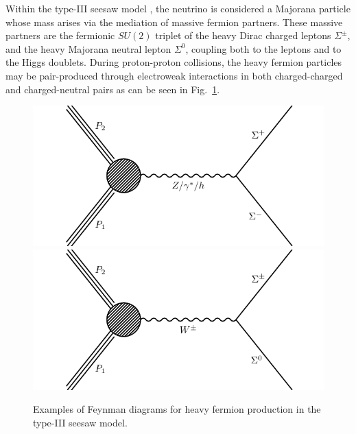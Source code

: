 
Within the type-III seesaw model \cite{SeesawIII:a}, the neutrino is considered a Majorana particle whose mass arises via the mediation of massive fermion partners. These massive partners are the fermionic $SU(2)$ triplet of the heavy Dirac charged leptons $\Sigma^\pm$, and the heavy Majorana neutral lepton $\Sigma^0$, coupling both to the leptons and to the Higgs doublets. During proton-proton collisions, the heavy fermion particles may be pair-produced through electroweak interactions in both charged-charged and charged-neutral pairs as can be seen in Fig.~\ref{fig:SeesawProduction}.

\begin{figure}
\begin{center}
	\includegraphics[width=.5\textwidth]{Introduction/SeesawProduction-SpSm}%
	\includegraphics[width=.5\textwidth]{Introduction/SeesawProduction-SpmS0}
	\caption{Examples of Feynman diagrams for heavy fermion production in the type-III seesaw model.
	\label{fig:SeesawProduction}}
\end{center}
\end{figure}

